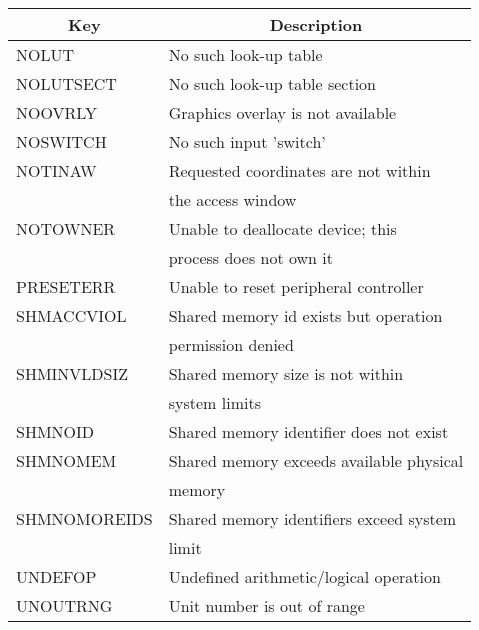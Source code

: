 \begin{tabular}{|l|l|}
\hline
\multicolumn{1}{|c|}{Key}
&\multicolumn{1}{|c|}{Description}\\ \hline
NOLUT & No such look-up table\\
NOLUTSECT & No such look-up table section\\
NOOVRLY & Graphics overlay is not available\\
NOSWITCH & No such input 'switch'\\
NOTINAW & Requested coordinates are not within\\
& the access window\\
NOTOWNER & Unable to deallocate device; this\\
& process does not own it\\
PRESETERR & Unable to reset peripheral controller\\
SHMACCVIOL & Shared memory id exists but operation\\
& permission denied\\
SHMINVLDSIZ & Shared memory size is not within\\
& system limits\\
SHMNOID & Shared memory identifier does not exist\\
SHMNOMEM & Shared memory exceeds available physical\\
& memory\\
SHMNOMOREIDS & Shared memory identifiers exceed system\\
& limit\\
UNDEFOP & Undefined arithmetic/logical operation\\
UNOUTRNG & Unit number is out of range\\
\hline
\end{tabular}

